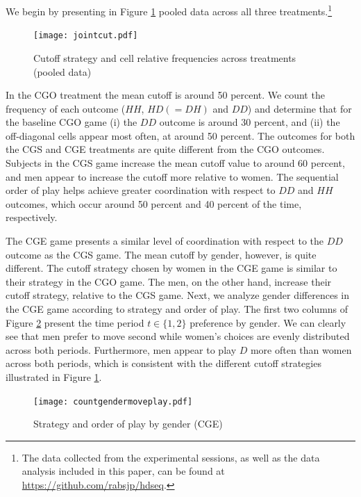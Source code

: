 \documentclass[12pt, letterpaper]{article}
\theoremstyle{plain}
\begin{document}
We begin by presenting in Figure \ref{fig:cutpooled} pooled data across all three treatments.\footnote{The data collected from the experimental sessions, as well as the data analysis included in this paper, can be found at \url{https://github.com/rabsjp/hdseq}.} 
\begin{center}
\begin{figure}[!ht]
\centering{}%
\texttt{[image: jointcut.pdf]}%
\caption{Cutoff strategy and cell relative frequencies across treatments (pooled data)} 
\label{fig:cutpooled}
\end{figure}
\end{center}
In the CGO treatment the mean cutoff is around 50 percent. We count the frequency of each outcome ($HH$, $HD (=DH)$ and $DD$) and determine that for the baseline CGO game (i) the $DD$ outcome is around 30 percent, and (ii) the off-diagonal cells appear most often, at around 50 percent. The outcomes for both the CGS and CGE treatments are quite different from the CGO outcomes. Subjects in the CGS game increase the mean cutoff value to around 60 percent, and men appear to increase the cutoff more relative to women. The sequential order of play helps achieve greater coordination with respect to $DD$ and $HH$ outcomes, which occur around 50 percent and 40 percent of the time, respectively. 




The CGE game presents a similar level of coordination with respect to the $DD$ outcome as the CGS game. The mean cutoff by gender, however, is quite different. The cutoff strategy chosen by women in the CGE game is similar to their strategy in the CGO game. The men, on the other hand, increase their cutoff strategy, relative to the CGS game. Next, we analyze gender differences in the CGE game according to strategy and order of play. The first two columns of Figure \ref{fig:cgepooled} present the time period $t\in\{1,2\}$ preference by gender. We can clearly see that men prefer to move second while women's choices are evenly distributed across both periods. Furthermore, men appear to play $D$ more often than women across both periods, which is consistent with the different cutoff strategies illustrated in Figure \ref{fig:cutpooled}.



\begin{center}
\begin{figure}[!ht]
\centering{}%
\texttt{[image: countgendermoveplay.pdf]}%
\caption{Strategy and order of play by gender (CGE)} 
\label{fig:cgepooled}
\end{figure}
\end{center}
\end{document}
